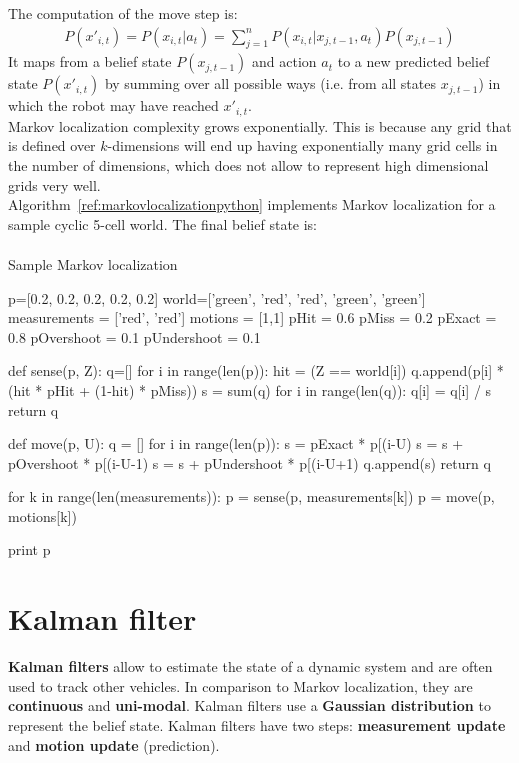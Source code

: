 \documentclass{report}
\begin{document}
The computation of the move step is:
\begin{align*}
P(x'_{i,t}) = P(x_{i,t}\vert a_t) = \sum_{j=1}^{n} P(x_{i,t}\vert x_{j,t-1},a_t)P(x_{j,t-1})
\end{align*}
It maps from a belief state $P(x_{j,t-1})$ and action $a_t$ to a new predicted belief state $P(x'_{i,t})$ by
summing over all possible ways (i.e. from all states $x_{j,t-1}$) in which the robot may have reached $x'_{i,t}$. \\
Markov localization complexity grows exponentially. This is because any grid that is defined over $k$-dimensions will end up having exponentially many grid cells in the number of dimensions, which does not allow to represent high dimensional grids very well. \\
Algorithm~\ref{ref:markovlocalizationpython} implements Markov localization for a sample cyclic 5-cell world. The final belief state is:
\begin{align*}
[0.0789, 0.0753, 0.2247, {\bf 0.4329}, 0.1882]
\end{align*}

\begin{algorithm}
\caption{Sample Markov localization}
\label{ref:markovlocalizationpython}
\begin{python}
p=[0.2, 0.2, 0.2, 0.2, 0.2]
world=['green', 'red', 'red', 'green', 'green']
measurements = ['red', 'red']
motions = [1,1]
pHit = 0.6
pMiss = 0.2
pExact = 0.8
pOvershoot = 0.1
pUndershoot = 0.1

def sense(p, Z):
    q=[]
    for i in range(len(p)):
        hit = (Z == world[i])
        q.append(p[i] * (hit * pHit + (1-hit) * pMiss))
    s = sum(q)
    for i in range(len(q)):
        q[i] = q[i] / s
    return q

def move(p, U):
    q = []
    for i in range(len(p)):
        s = pExact * p[(i-U) %
        s = s + pOvershoot * p[(i-U-1) %
        s = s + pUndershoot * p[(i-U+1) %
        q.append(s)
    return q

for k in range(len(measurements)):
    p = sense(p, measurements[k])
    p = move(p, motions[k])

print p
\end{python}
\end{algorithm}


\section{Kalman filter}
{\bf Kalman filters} allow to estimate the state of a dynamic system and are often used to track other vehicles. In comparison to Markov localization, they are {\bf continuous} and {\bf uni-modal}. Kalman filters use a {\bf Gaussian distribution} to represent the belief state. Kalman filters have two steps: {\bf measurement update} and {\bf motion update} (prediction). \\
\end{document}
